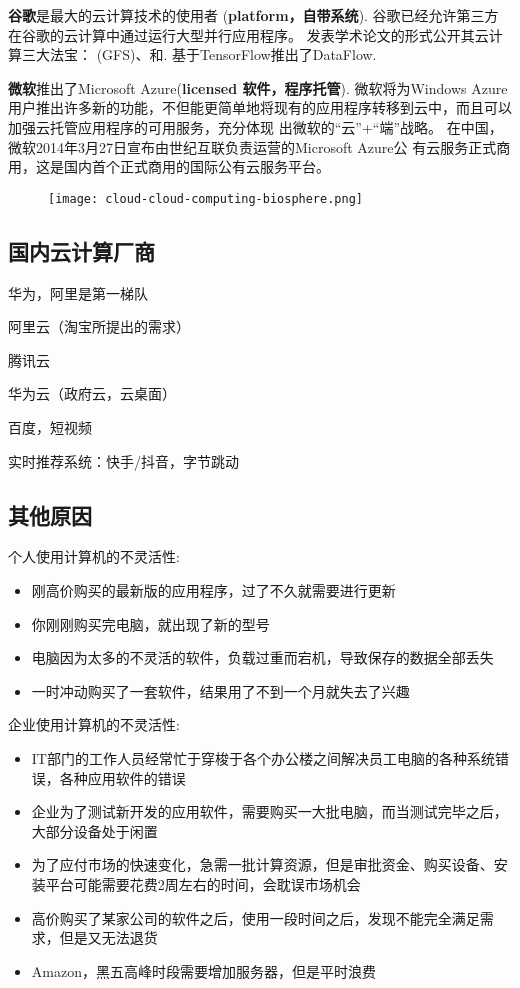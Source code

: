 \textbf{谷歌}是最大的云计算技术的使用者 (\textbf{platform，自带系统}). 谷歌已经允许第三方在谷歌的云计算中通过运行大型并行应用程序。 发表学术论文的形式公开其云计算三大法宝： (GFS)、和. 基于TensorFlow推出了DataFlow.


\textbf{微软}推出了Microsoft Azure(\textbf{licensed 软件，程序托管}). 微软将为Windows Azure用户推出许多新的功能，不但能更简单地将现有的应用程序转移到云中，而且可以加强云托管应用程序的可用服务，充分体现 出微软的“云”+“端”战略。 在中国，微软2014年3月27日宣布由世纪互联负责运营的Microsoft Azure公 有云服务正式商用，这是国内首个正式商用的国际公有云服务平台。 

\begin{figure}[htbp]
    \centering
    \texttt{[image: cloud-cloud-computing-biosphere.png]}
\end{figure}

\subsection{国内云计算厂商}

华为，阿里是第一梯队

阿里云（淘宝所提出的需求） 

腾讯云 

华为云（政府云，云桌面）

百度，短视频

实时推荐系统：快手/抖音，字节跳动

\subsection{其他原因}

个人使用计算机的不灵活性:

\begin{itemize}
    \item 刚高价购买的最新版的应用程序，过了不久就需要进行更新
    \item 你刚刚购买完电脑，就出现了新的型号
    \item 电脑因为太多的不灵活的软件，负载过重而宕机，导致保存的数据全部丢失
    \item 一时冲动购买了一套软件，结果用了不到一个月就失去了兴趣
\end{itemize}

企业使用计算机的不灵活性:

\begin{itemize}
    
    \item IT部门的工作人员经常忙于穿梭于各个办公楼之间解决员工电脑的各种系统错误，各种应用软件的错误
    \item 企业为了测试新开发的应用软件，需要购买一大批电脑，而当测试完毕之后，大部分设备处于闲置
    \item 为了应付市场的快速变化，急需一批计算资源，但是审批资金、购买设备、安装平台可能需要花费2周左右的时间，会耽误市场机会
    \item 高价购买了某家公司的软件之后，使用一段时间之后，发现不能完全满足需求，但是又无法退货
    \item Amazon，黑五高峰时段需要增加服务器，但是平时浪费
\end{itemize}

